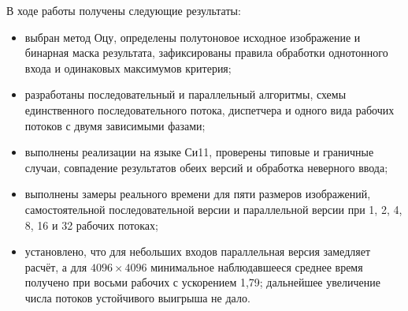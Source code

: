 В ходе работы получены следующие результаты:
\begin{itemize}
\item выбран метод Оцу, определены полутоновое исходное изображение и бинарная маска результата, зафиксированы правила обработки однотонного входа и одинаковых максимумов критерия;
\item разработаны последовательный и параллельный алгоритмы, схемы единственного последовательного потока, диспетчера и одного вида рабочих потоков с двумя зависимыми фазами;
\item выполнены реализации на языке Си11, проверены типовые и граничные случаи, совпадение результатов обеих версий и обработка неверного ввода;
\item выполнены замеры реального времени для пяти размеров изображений, самостоятельной последовательной версии и параллельной версии при 1, 2, 4, 8, 16 и 32 рабочих потоках;
\item установлено, что для небольших входов параллельная версия замедляет расчёт, а для $4096\times4096$ минимальное наблюдавшееся среднее время получено при восьми рабочих с ускорением 1,79; дальнейшее увеличение числа потоков устойчивого выигрыша не дало.
\end{itemize}
